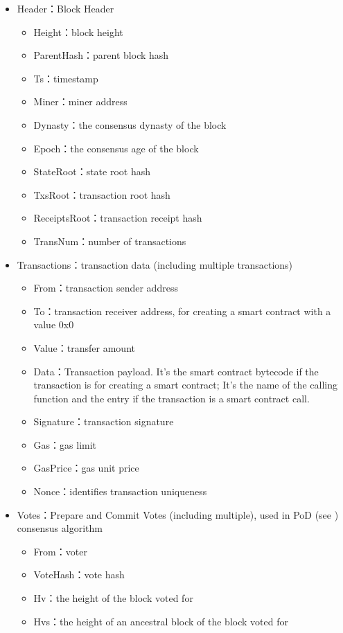 \begin{itemize}
	\item Header：Block Header
		\begin{itemize}
		\item Height：block height
		\item ParentHash：parent block hash
		\item Ts：timestamp
		\item Miner：miner address
		\item Dynasty：the consensus dynasty of the block
		\item Epoch：the consensus age of the block
		\item StateRoot：state root hash
		\item TxsRoot：transaction root hash
		\item ReceiptsRoot：transaction receipt hash
		\item TransNum：number of transactions
		\end{itemize}
	\item Transactions：transaction data (including multiple transactions)
		\begin{itemize}
		\item From：transaction sender address
		\item To：transaction receiver address, for creating a smart contract with a value 0x0
		\item Value：transfer amount
		\item Data：Transaction payload. It's the smart contract bytecode if the transaction is for creating a smart contract; It's the name of the calling function and the entry if the transaction is a smart contract call.
		\item Signature：transaction signature
		\item Gas：gas limit
		\item GasPrice：gas unit price
		\item Nonce：identifies transaction uniqueness
		\end{itemize}
	\item Votes：Prepare and Commit Votes (including multiple), used in PoD (see ) consensus algorithm
		\begin{itemize}
		\item From：voter
		\item VoteHash：vote hash
		\item Hv：the height of the block voted for
		\item Hvs：the height of an ancestral block of the block voted for

\end{itemize}
\end{itemize}
